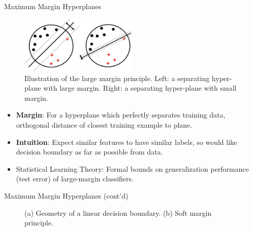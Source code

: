 \documentclass[10pt,mathserif]{beamer}
\begin{document}
\begin{frame}{Maximum Margin Hyperplanes}
\begin{figure}[h]
\centering
\includegraphics[width=0.5\textwidth]{largeMarginPrinciple2}
\caption{Illustration of the large margin principle. Left: a separating hyper-plane with large margin. Right: a separating hyper-plane with small margin.}
\end{figure}
\begin{itemize}
    \item \textbf{Margin}: For a hyperplane which perfectly separates training data, orthogonal distance of closest training example to plane.
    \item \textbf{Intuition}: Expect similar features to have similar labels, so would like decision boundary as far as possible from data.
    \item Statistical Learning Theory: Formal bounds on generalization performance (test error) of large-margin classifiers.
    \end{itemize}
\end{frame}

\begin{frame}{Maximum Margin Hyperplanes (cont'd)}
\begin{figure}[h]
\centering     %
{}
\caption{(a) Geometry of a linear decision boundary. (b) Soft margin principle.}
\end{figure}
\end{frame}
\end{document}
